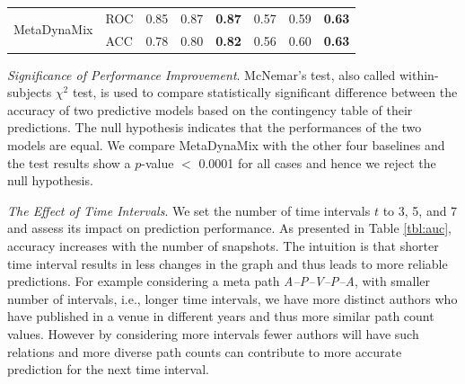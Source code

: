 \begin{table}[t]
\begin{tabular}{ll|p{1cm}|p{1cm}|p{1cm}||p{1cm}|p{1cm}|p{1cm}|}
\multicolumn{1}{|l|}{\multirow{2}{*}{MetaDynaMix}}  & ROC  & 0.85 &  0.87 & \textbf{0.87}   &  0.57  & 0.59 &  \textbf{0.63}  \\ \cline{2-8}
\multicolumn{1}{|l|}{}  & ACC  & 0.78 & 0.80 & \textbf{0.82}   & 0.56  &  0.60  &   \textbf{0.63} \\ \hline

\end{tabular}
\end{table}





\textit{Significance of Performance Improvement}. McNemar's test, also called within-subjects $\chi^2$ test, is used to compare statistically significant difference between the accuracy of two predictive models based on the contingency table of their predictions. The null hypothesis indicates that the performances of the two models are equal. We compare MetaDynaMix with the other four baselines and the test results show a $p$-value $<$ 0.0001 for all cases and hence we reject the null hypothesis.

%    
%    
%
    
    


\textit{The Effect of Time Intervals}. We set the number of time intervals $t$ to 3, 5, and 7 and assess its impact on prediction performance. As presented in Table \ref{tbl:auc}, accuracy increases with the number of snapshots. The intuition is that shorter time interval results in less changes in the graph and thus leads to more reliable predictions. For example considering a meta path \textit{A--P--V--P--A}, with smaller number of intervals, i.e., longer time intervals, we have more distinct authors who have published in a venue in different years and thus more similar path count values. However by considering more intervals fewer authors will have such relations and more diverse path counts can contribute to more accurate prediction for the next time interval.


